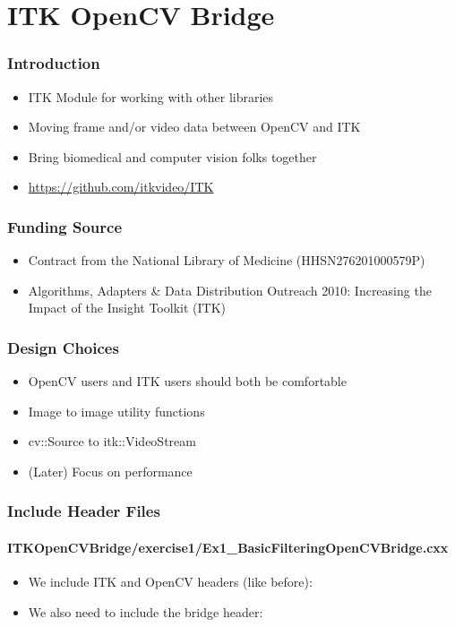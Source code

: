 \section{ITK OpenCV Bridge}



\begin{frame}
\frametitle{Introduction}
\begin{itemize}
\item ITK Module for working with other libraries
\item Moving frame and/or video data between OpenCV and ITK
\item Bring biomedical and computer vision folks together
\item \url{https://github.com/itkvideo/ITK}
\end{itemize}
\end{frame}

\begin{frame}
\frametitle{Funding Source}
\begin{itemize}
\item Contract from the National Library of Medicine (HHSN276201000579P)
\item Algorithms, Adapters \& Data Distribution Outreach 2010:
  Increasing the Impact of the Insight Toolkit (ITK)
\end{itemize}
\end{frame}

\begin{frame}
\frametitle{Design Choices}
\begin{itemize}
\item OpenCV users and ITK users should both be comfortable
\item Image to image utility functions
\item cv::Source to itk::VideoStream
\item (Later) Focus on performance
\end{itemize}
\end{frame}


\begin{frame}
\frametitle{Include Header Files}
\framesubtitle{ITKOpenCVBridge/exercise1/Ex1\_BasicFilteringOpenCVBridge.cxx}
\begin{itemize}
\item We include ITK and OpenCV headers (like before):
\item We also need to include the bridge header:
\end{itemize}
\end{frame}

